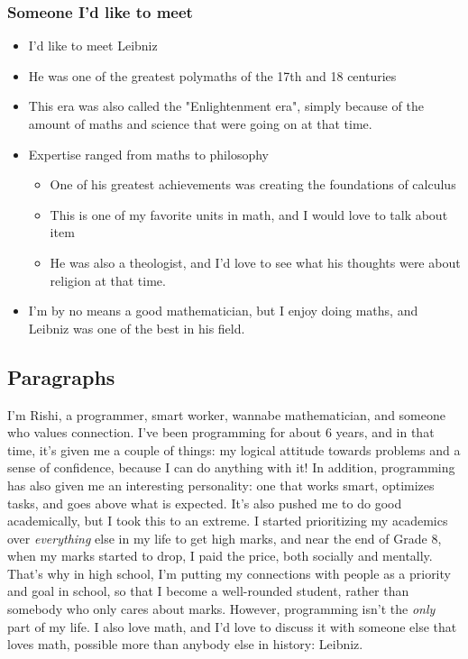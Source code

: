 \documentclass[]{article}
\begin{document}
\subsubsection*{Someone I'd like to meet}
\begin{itemize}
    \item I'd like to meet Leibniz
    \item He was one of the greatest polymaths of the 17th and 18 centuries
    \item This era was also called the "Enlightenment era", simply because of the amount of maths and science that were going on at that time.
    \item Expertise ranged from maths to philosophy
    \begin{itemize}
        \item One of his greatest achievements was creating the foundations of calculus
        \item This is one of my favorite units in math, and I would love to talk about item
        \item He was also a theologist, and I'd love to see what his thoughts were about religion at that time.
    \end{itemize}
    \item I'm by no means a good mathematician, but I enjoy doing maths, and Leibniz was one of the best in his field.
\end{itemize}

\newpage

\subsection*{Paragraphs}

I'm Rishi, a programmer, smart worker, wannabe mathematician, and someone who values connection. I've been programming for about 6 years, and in that time, it's given me a couple of things: my logical attitude towards problems and a sense of confidence, because I can do anything with it! In addition, programming has also given me an interesting personality: one that works smart, optimizes tasks, and goes above what is expected. It's also pushed me to do good academically, but I took this to an extreme. I started prioritizing my academics over \textit{everything} else in my life to get high marks, and near the end of Grade 8, when my marks started to drop, I paid the price, both socially and mentally. That's why in high school, I'm putting my connections with people as a priority and goal in school, so that I become a well-rounded student, rather than somebody who only cares about marks. However, programming isn't the \textit{only} part of my life. I also love math, and I'd love to discuss it with someone else that loves math, possible more than anybody else in history: Leibniz.
\newline
\end{document}
